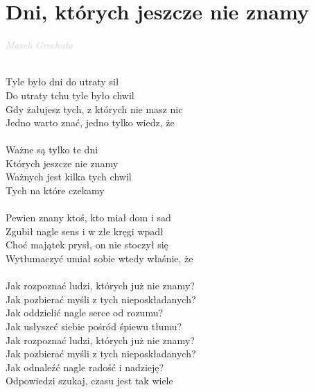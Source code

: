 \documentclass[a5paper, 10pt]{book}
\begin{document}
\section{Dni, których jeszcze nie znamy}\textcolor{lightgray}{\textit{Marek Grechuta}}\\~\\
\begin{minipage}[t]{0.7\textwidth}
Tyle było dni do utraty sił\\
Do utraty tchu tyle było chwil\\
Gdy żałujesz tych, z których nie masz nic\\
Jedno warto znać, jedno tylko wiedz, że\\
\\
\hspace*{10mm}Ważne są tylko te dni\\
\hspace*{10mm}Których jeszcze nie znamy\\
\hspace*{10mm}Ważnych jest kilka tych chwil\\
\hspace*{10mm}Tych na które czekamy\\
\\
Pewien znany ktoś, kto miał dom i sad\\
Zgubił nagle sens i w złe kręgi wpadł\\
Choć majątek prysł, on nie stoczył się\\
Wytłumaczyć umiał sobie wtedy właśnie, że\\
\\
\hspace*{5mm}Jak rozpoznać ludzi, których już nie znamy?\\
\hspace*{5mm}Jak pozbierać myśli z tych nieposkładanych?\\
\hspace*{5mm}Jak oddzielić nagle serce od rozumu?\\
\hspace*{5mm}Jak usłyszeć siebie pośród śpiewu tłumu?\vspace*{2mm}
\\
\hspace*{5mm}Jak rozpoznać ludzi, których już nie znamy?\\
\hspace*{5mm}Jak pozbierać myśli z tych nieposkładanych?\\
\hspace*{5mm}Jak odnaleźć nagle radość i nadzieję?\\
\hspace*{5mm}Odpowiedzi szukaj, czasu jest tak wiele\\

\end{minipage}
\end{document}
